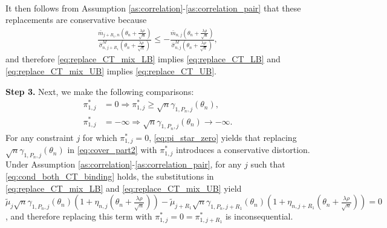 \documentclass[letterpaper,11pt]{article}
\theoremstyle{myplain}
\theoremstyle{mydefinition}
\theoremstyle{myremark}
\newcommand{\larhon}{\frac{\lambda \rho }{\sqrt n}}
\numberwithin{equation}{section}
\numberwithin{figure}{section}
\begin{document}
\begin{appendices}
\begin{align}
\end{align}
It then follows from Assumption \ref{as:correlation}-\ref{as:correlation_pair} that these replacements are conservative  because 
\begin{align*}
\frac{\bar{m}_{j+R_1,n}(\theta_n+\larhon)}{\hat\sigma^M_{n,j+R_1}(\theta_n+\larhon)}\le -\frac{\bar{m}_{n,j}(\theta_n+\larhon)}{\hat\sigma^M_{n,j}(\theta_n+\larhon)},
\end{align*}
and therefore \eqref{eq:replace_CT_mix_LB} implies \eqref{eq:replace_CT_LB} and \eqref{eq:replace_CT_mix_UB} implies \eqref{eq:replace_CT_UB}.





















\noindent \textbf{Step 3.} Next, we make the following comparisons:
\begin{align}
\pi_{1,j}^*&= 0 \Rightarrow \pi_{1,j}^* \ge \sqrt{n} \gamma_{1,P_n,j}(\theta_n), \label{eq:pi_star_zero}\\
\pi_{1,j}^*&= -\infty \Rightarrow \sqrt{n} \gamma_{1,P_n,j}(\theta_n) \to -\infty.\label{eq:pi_star_inf}
\end{align}
For any constraint $j$ for which $\pi_{1,j}^*= 0$, \eqref{eq:pi_star_zero} yields that replacing $\sqrt{n} \gamma_{1,P_n,j}(\theta_n)$ in \eqref{eq:cover_part2} with $\pi_{1,j}^*$ introduces a conservative distortion. Under Assumption \ref{as:correlation}-\ref{as:correlation_pair}, for any $j$ such that \eqref{eq:cond_both_CT_binding} holds, the substitutions in \eqref{eq:replace_CT_mix_LB} and \eqref{eq:replace_CT_mix_UB} yield $\tilde\mu_j\sqrt{n} \gamma_{1,P_n,j}(\theta_n)(1+\eta_{n,j}(\theta_n+\larhon))-\tilde\mu_{j+R_1}\sqrt{n} \gamma_{1,P_n,j+R_1}(\theta_n)(1+\eta_{n,j+R_1}(\theta_n+\larhon))=0$, and therefore replacing this term with $\pi_{1,j}^*=0=\pi_{1,j+R_1}^*$ is inconsequential.


\end{appendices}
\end{document}
